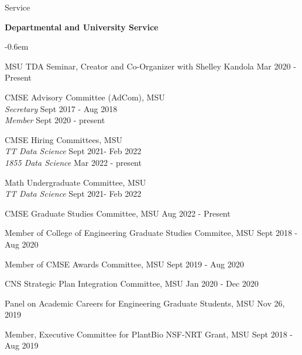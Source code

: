 \documentclass{resume} %
\begin{document}
\begin{rSection}{Service}



\textbf{Departmental and University Service}
\begin{list}{}{\leftmargin=1em}
   \itemsep -0.6em \vspace{-0.5em} %

\item
MSU TDA Seminar, Creator and Co-Organizer with Shelley Kandola  \hfill Mar 2020 - Present

\item
CMSE Advisory Committee (AdCom), MSU\\
\phantom{xxx} \textit{Secretary} \hfill  Sept 2017 - Aug 2018\\
\phantom{xxx} \textit{Member} \hfill Sept 2020 - present

\item CMSE Hiring Committees, MSU \\
\phantom{xxx} \textit{TT Data Science} \hfill  Sept 2021- Feb 2022\\
\phantom{xxx} \textit{1855 Data Science } \hfill Mar 2022 - present
\item Math Undergraduate Committee, MSU \\
\phantom{xxx} \textit{TT Data Science} \hfill  Sept 2021- Feb 2022\\

\item
CMSE Graduate Studies Committee, MSU \hfill  Aug 2022 - Present 
\item
Member of College of Engineering Graduate Studies Commitee, MSU \hfill Sept 2018 - Aug 2020
\item
Member of CMSE Awards Committee, MSU \hfill Sept 2019 - Aug 2020
\item
CNS Strategic Plan Integration Committee, MSU \hfill Jan 2020 - Dec 2020
\item
Panel on Academic Careers for Engineering Graduate Students, MSU \hfill Nov 26, 2019
\item Member, Executive Committee for PlantBio NSF-NRT Grant, MSU
\hfill Sept 2018 - Aug 2019


\end{list}
\end{rSection}
\end{document}
